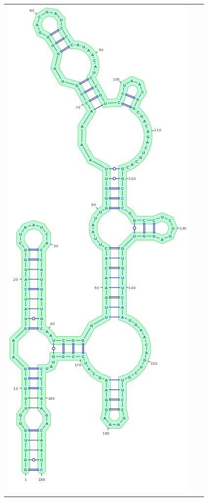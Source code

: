 \documentclass[11pt]{article} %
\begin{document}
\begin{figure}[H]
{\begin{adjustbox}{max width=\textwidth,max height=\textheight,keepaspectratio}
\begin{tabular}{@{}ccc@{}}
 \includegraphics[scale=\MyScale]{graphs/Supp_structures/native_structure}&

\end{tabular}
\end{adjustbox}}
\end{figure}
\end{document}
